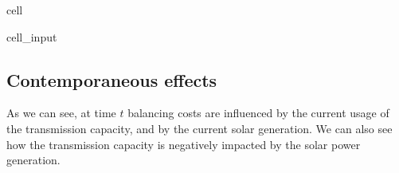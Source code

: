 \documentclass[letterpaper,10pt,english]{jupyterBook}
\begin{document}
\begin{sphinxuseclass}{cell}\begin{sphinxVerbatimInput}

\begin{sphinxuseclass}{cell_input}
\begin{sphinxVerbatim}[commandchars=\\\{\}]
  \PYG{p}{[}\PYG{p}{[}  \PYG{p}{]}
      \PYG{p}{[}  \PYG{p}{]}
      \PYG{p}{[}  \PYG{p}{]}\PYG{p}{]}

  \PYG{p}{[}\PYG{p}{[}  \PYG{p}{]}
      \PYG{p}{[}  \PYG{p}{]}
      \PYG{p}{[} \PYG{p}{]}\PYG{p}{]}

  \PYG{p}{[}  \PYG{p}{]}
\end{sphinxVerbatim}

\end{sphinxuseclass}\end{sphinxVerbatimInput}

\end{sphinxuseclass}

\subsection{Contemporaneous effects}
\label{\detokenize{notebooks/semiparametric_varlingam:contemporaneous-effects}}
\sphinxAtStartPar
As we can see, at time \(t\) balancing costs are influenced by the current usage of the transmission capacity, and by the current solar generation. We can also see how the transmission capacity is negatively impacted by the solar power generation.
\end{document}
